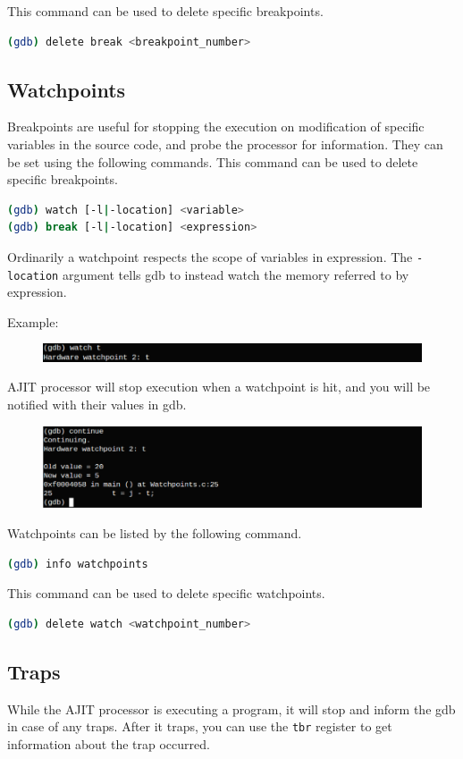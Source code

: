 \documentclass[a4paper, 11pt]{article}
\begin{document}
This command can be used to delete specific breakpoints.
\begin{lstlisting}[language=bash]
(gdb) delete break <breakpoint_number>
\end{lstlisting}

\subsection*{Watchpoints}
Breakpoints are useful for stopping the execution on modification of specific variables in the source code, and probe the processor for information. They can be set using the following commands.
This command can be used to delete specific breakpoints.
\begin{lstlisting}[language=bash]
(gdb) watch [-l|-location] <variable>
(gdb) break [-l|-location] <expression>
\end{lstlisting}
Ordinarily a watchpoint respects the scope of variables in expression. The \texttt{-location} argument tells gdb to instead watch the memory referred to by expression.

Example:
\begin{figure}[H]
	\centering
	\includegraphics[width=0.8\columnwidth]{Figs/sixth.png}
\end{figure}
AJIT processor will stop execution when a watchpoint is hit, and you will be notified with their values in gdb.
\begin{figure}[H]
	\centering
	\includegraphics[width=0.8\columnwidth]{Figs/seventh.png}
\end{figure}
Watchpoints can be listed by the following command.
\begin{lstlisting}[language=bash]
(gdb) info watchpoints
\end{lstlisting}

This command can be used to delete specific watchpoints.
\begin{lstlisting}[language=bash]
(gdb) delete watch <watchpoint_number>
\end{lstlisting}

\subsection*{Traps}
While the AJIT processor is executing a program, it will stop and inform the gdb in case of any traps. After it traps, you can use the \texttt{tbr} register to get information about the trap occurred.
\end{document}
